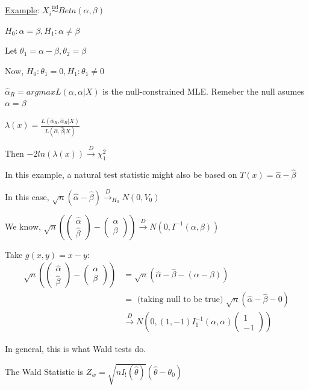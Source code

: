\documentclass{article}
\newcommand{\dto}{\overset{D}{\to}}
\newcommand{\iiddist}{\overset{\mathrm{iid}}{\sim}}
\begin{document}
\underline{Example}: $X_i \iiddist Beta(\alpha, \beta)$

$H_0: \alpha = \beta, H_1: \alpha \neq \beta$

Let $\theta_1 = \alpha - \beta, \theta_2 = \beta$

Now, $H_0: \theta_1 = 0, H_1: \theta_1 \neq 0$

$\hat{\alpha}_R = argmax L(\alpha, \alpha|X)$ is the null-constrained MLE. Remeber the null asumes $\alpha = \beta$

$\lambda(x) = \frac{L(\hat{\alpha}_R, \hat{\alpha}_R | X)}{L(\hat{\alpha}, \hat{\beta}|X)}$

Then $-2ln(\lambda(x)) \dto \chi^2_1$

In this example, a natural test statistic might also be based on $T(x) = \hat{\alpha} - \hat{\beta}$

In this case, $\sqrt{n}(\hat{\alpha} - \hat{\beta}) \dto_{H_0} N(0, V_0)$

We know, $\sqrt{n}(\begin{pmatrix} \hat{\alpha} \\ \hat{\beta} \end{pmatrix} - \begin{pmatrix} \alpha \\ \beta \end{pmatrix}) \dto N(0, I^{-1}(\alpha, \beta))$

Take $g(x, y) = x - y: $
$$
\begin{aligned}
\sqrt{n}(\begin{pmatrix} \hat{\alpha} \\ \hat{\beta} \end{pmatrix} - \begin{pmatrix} \alpha \\ \beta \end{pmatrix}) 
& = \sqrt{n}(\hat{\alpha} - \hat{\beta} - (\alpha - \beta)) \\
& = \text{ (taking null to be true) } \sqrt{n}(\hat{\alpha} - \hat{\beta} - 0) \\
& \dto N(0, (1,-1)I_1^{-1}(\alpha, \alpha)\begin{pmatrix} 1 \\ -1 \end{pmatrix})
\end{aligned} 
$$

In general, this is what Wald tests do. 

The Wald Statistic is $Z_w = \sqrt{n I_!(\hat{\theta})}(\hat{\theta} - \theta_0)$
\end{document}
